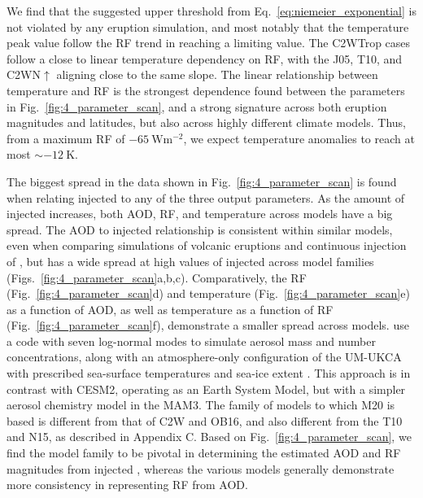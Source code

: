 \documentclass[draft]{agujournal2019}
\begin{document}
We find that the suggested upper threshold from Eq.~\ref{eq:niemeier_exponential} is not
violated by any eruption simulation, and most notably that the temperature peak value
follow the RF trend in reaching a limiting value. The C2WTrop cases follow a close to
linear temperature dependency on RF, with the J05, T10, and C2WN\(\uparrow\) aligning
close to the same slope. The linear relationship between temperature and RF is the
strongest dependence found between the parameters in Fig.~\ref{fig:4_parameter_scan},
and a strong signature across both eruption magnitudes and latitudes, but also across
highly different climate models. Thus, from a maximum RF of
\(\SI{-65}{\watt\metre^{-2}}\), we expect temperature anomalies to reach at most
\(\sim\SI{-12}{\kelvin}\).

The biggest spread in the data shown in Fig.~\ref{fig:4_parameter_scan} is found when
relating injected  to any of the three output parameters. As the amount of
injected  increases, both AOD, RF, and temperature across models have a big
spread. The AOD to injected  relationship is consistent within similar models,
even when comparing simulations of volcanic eruptions \cite{timmreck2010} and continuous
injection of  \cite{niemeier2015}, but has a wide spread at high values of
injected  across model families (Figs.~\ref{fig:4_parameter_scan}a,b,c).
Comparatively, the RF (Fig.~\ref{fig:4_parameter_scan}d) and temperature
(Fig.~\ref{fig:4_parameter_scan}e) as a function of AOD, as well as temperature as a
function of RF (Fig.~\ref{fig:4_parameter_scan}f), demonstrate a smaller spread across
models.  use a code with seven
log-normal modes to simulate aerosol mass and number concentrations, along with an
atmosphere-only configuration of the UM-UKCA with prescribed sea-surface temperatures
and sea-ice extent \cite{marshall2019}. This approach is in contrast with CESM2,
operating as an Earth System Model, but with a simpler aerosol chemistry model in the
MAM3. The family of models to which M20 is based is different from that of C2W and OB16,
and also different from the T10 and N15, as described in Appendix C. Based on
Fig.~\ref{fig:4_parameter_scan}, we find the model family to be pivotal in determining
the estimated AOD and RF magnitudes from injected , whereas the various models
generally demonstrate more consistency in representing RF from AOD.
\end{document}
